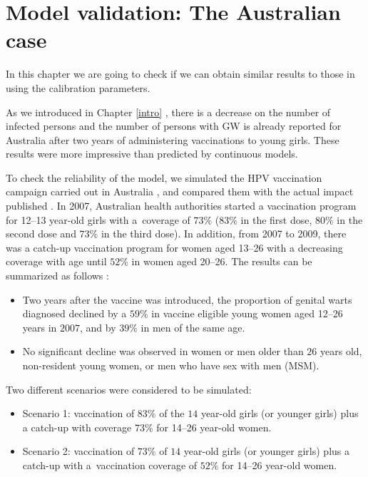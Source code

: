 \chapter{Model validation: The Australian case}\label{Australiano}

In this chapter we are going to check if we can obtain similar results to those in \cite{ali2013genital,fairley2009rapid} using the calibration parameters.

As we introduced in Chapter \ref{intro} \cite{ali2013genital}, there is a decrease on the number of infected persons and the number of persons with GW is already reported for Australia after two years of administering vaccinations to young girls. These results were more impressive than predicted by continuous models.

To check the reliability of the model, we simulated the HPV vaccination campaign carried out in Australia \cite{ali2013genital}, and compared them with the actual impact published \cite{ali2013genital}. In 2007, Australian health authorities started a vaccination program for 12--13 year-old girls with a~coverage of $73\%$ ($83\%$ in the first dose, $80\%$ in the second dose and $73\%$ in the third dose). In addition, from 2007 to 2009, there was a catch-up vaccination program for women aged 13--26 with a decreasing coverage with age until $52\%$ in women aged 20--26. The results can be summarized as follows \cite{ali2013genital}:

\begin{itemize}
	\item Two years after the vaccine was introduced, the proportion of genital warts diagnosed declined by a $59\%$ in vaccine eligible young women aged 12--26 years in $2007$, and by $39\%$ in men of the same age.
	\item No significant decline was observed in women or men older than $26$ years old, non-resident young women, or men who have sex with men (MSM).
\end{itemize}

Two different scenarios were considered to be simulated:

\begin{itemize}
	\item Scenario 1: vaccination of $83\%$ of the $14$ year-old girls (or younger girls) plus a catch-up with coverage $73\%$ for 14--26 year-old women.
	\item Scenario 2: vaccination of $73\%$ of $14$ year-old girls (or younger girls) plus a catch-up with a~vaccination coverage of $52\%$ for 14--26 year-old women.
\end{itemize}

